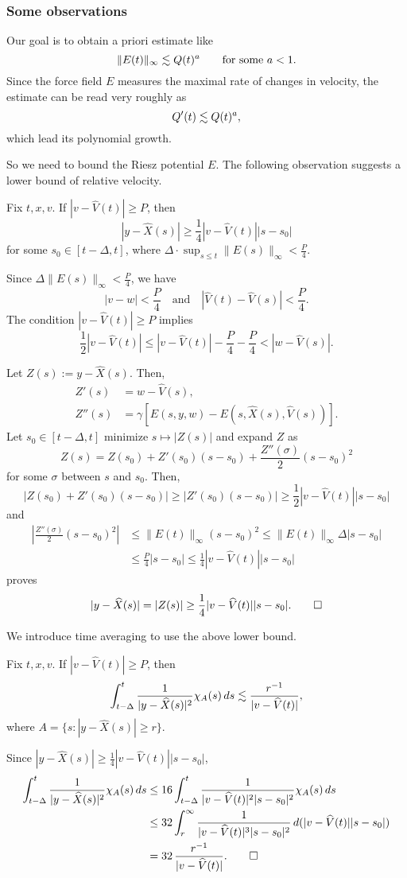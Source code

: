 \documentclass[11pt]{amsart}
\begin{document}
\subsubsection{Some observations}
Our goal is to obtain a priori estimate like
\[\|E(t)\|_\infty\les Q(t)^a\qquad\text{for some }a<1.\]
Since the force field $E$ measures the maximal rate of changes in velocity, the estimate can be read very roughly as
\[Q'(t)\les Q(t)^a,\]
which lead its polynomial growth.

So we need to bound the Riesz potential $E$.
The following observation suggests a lower bound of relative velocity.
\begin{clm}
Fix $t,x,v$.
If $|v-\hat V(t)|\ge P$, then
\[|y-\hat X(s)|\ge\frac14|v-\hat V(t)||s-s_0|\]
for some $s_0\in[t-\Delta,t]$, where $\Delta\cdot\sup_{s\le t}\|E(s)\|_\infty<\frac P4$.
\end{clm}
\begin{pf}
Since $\Delta\|E(s)\|_\infty<\frac P4$, we have
\[|v-w|<\frac P4\quad\text{and}\quad|\hat V(t)-\hat V(s)|<\frac P4.\]
The condition $|v-\hat V(t)|\ge P$ implies
\[\frac12|v-\hat V(t)|\le|v-\hat V(t)|-\frac P4-\frac P4<|w-\hat V(s)|.\]

Let $Z(s):=y-\hat X(s)$.
Then,
\begin{align*}
Z'(s)&=w-\hat V(s),\\
Z''(s)&=\gamma[E(s,y,w)-E(s,\hat X(s),\hat V(s))].
\end{align*}
Let $s_0\in[t-\Delta,t]$ minimize $s\mapsto|Z(s)|$ and expand $Z$ as
\[Z(s)=Z(s_0)+Z'(s_0)(s-s_0)+\frac{Z''(\sigma)}2(s-s_0)^2\]
for some $\sigma$ between $s$ and $s_0$.
Then,
\[|Z(s_0)+Z'(s_0)(s-s_0)|\ge|Z'(s_0)(s-s_0)|\ge\frac12|v-\hat V(t)||s-s_0|\]
and
\begin{align*}
|\frac{Z''(\sigma)}2(s-s_0)^2|
&\le\|E(t)\|_\infty(s-s_0)^2
\le\|E(t)\|_\infty\Delta|s-s_0|\\
&\le\frac P4|s-s_0|
\le\frac14|v-\hat V(t)||s-s_0|
\end{align*}
proves
\[|y-\hat X(s)|=|Z(s)|\ge\frac14|v-\hat V(t)||s-s_0|.\qedhere\]
\end{pf}

We introduce time averaging to use the above lower bound.
\begin{clm}
Fix $t,x,v$.
If $|v-\hat V(t)|\ge P$, then
\[\int_{t-\Delta}^t\frac1{|y-\hat X(s)|^2}\chi_A(s)\,ds\les\frac{r^{-1}}{|v-\hat V(t)|},\]
where $A=\{s:|y-\hat X(s)|\ge r\}$.
\end{clm}
\begin{pf}
Since $|y-\hat X(s)|\ge\frac14|v-\hat V(t)||s-s_0|$,
\begin{align*}
\int_{t-\Delta}^t\frac1{|y-\hat X(s)|^2}\chi_A(s)\,ds
&\le16\int_{t-\Delta}^t\frac1{|v-\hat V(t)|^2|s-s_0|^2}\chi_A(s)\,ds\\
&\le32\int_r^\infty\frac1{|v-\hat V(t)|^3|s-s_0|^2}\,d(|v-\hat V(t)||s-s_0|)\\
&=32\,\frac{r^{-1}}{|v-\hat V(t)|}.\qedhere
\end{align*}
\end{pf}
\end{document}
